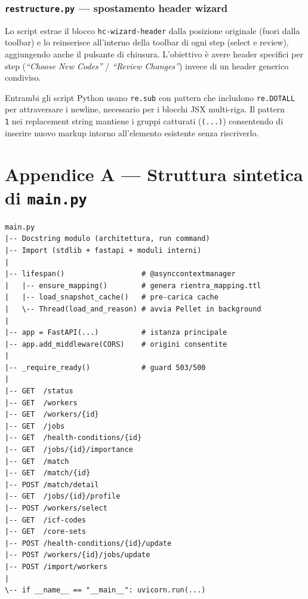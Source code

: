 \documentclass[a4paper,12pt]{article}
\begin{document}
\subsubsection{\texttt{restructure.py} --- spostamento header wizard}

Lo script estrae il blocco \texttt{hc-wizard-header} dalla posizione
originale (fuori dalla toolbar) e lo reinserisce all'interno della
toolbar di ogni step (select e review), aggiungendo anche il pulsante
di chiusura. L'obiettivo \`{e} avere header specifici per step
(\textit{``Choose New Codes''} / \textit{``Review Changes''}) invece
di un header generico condiviso.

Entrambi gli script Python usano \texttt{re.sub} con pattern che
includono \texttt{re.DOTALL} per attraversare i newline, necessario
per i blocchi JSX multi-riga. Il pattern \texttt{\\1} nei replacement
string mantiene i gruppi catturati (\texttt{(...)}) consentendo di
inserire nuovo markup intorno all'elemento esistente senza riscriverlo.


\section*{Appendice A --- Struttura sintetica di \texttt{main.py}}

\begin{lstlisting}[caption={Pseudo-outline di \texttt{main.py}.}, numbers=none]
main.py
|-- Docstring modulo (architettura, run command)
|-- Import (stdlib + fastapi + moduli interni)
|
|-- lifespan()                  # @asynccontextmanager
|   |-- ensure_mapping()        # genera rientra_mapping.ttl
|   |-- load_snapshot_cache()   # pre-carica cache
|   \-- Thread(load_and_reason) # avvia Pellet in background
|
|-- app = FastAPI(...)          # istanza principale
|-- app.add_middleware(CORS)    # origini consentite
|
|-- _require_ready()            # guard 503/500
|
|-- GET  /status
|-- GET  /workers
|-- GET  /workers/{id}
|-- GET  /jobs
|-- GET  /health-conditions/{id}
|-- GET  /jobs/{id}/importance
|-- GET  /match
|-- GET  /match/{id}
|-- POST /match/detail
|-- GET  /jobs/{id}/profile
|-- POST /workers/select
|-- GET  /icf-codes
|-- GET  /core-sets
|-- POST /health-conditions/{id}/update
|-- POST /workers/{id}/jobs/update
|-- POST /import/workers
|
\-- if __name__ == "__main__": uvicorn.run(...)
\end{lstlisting}
\end{document}
